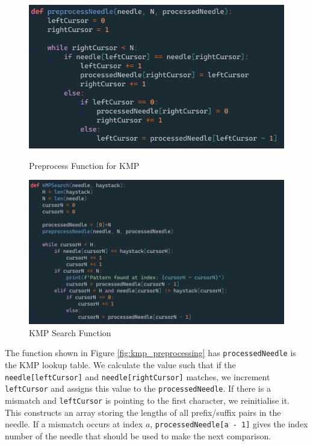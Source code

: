 \begin{figure}[H]
  \centering
  \begin{minipage}[b]{0.49\textwidth}
    \includegraphics[width=\textwidth]{images/preprocessKMP.png}
    \caption{Preprocess Function for KMP}
    \label{fig:kmp_preprocessing}
  \end{minipage}
  \hfill
  \begin{minipage}[b]{0.49\textwidth}
    \includegraphics[width=\textwidth]{images/KMP.png}
    \caption{KMP Search Function}
    \label{fig:kmp_search}
  \end{minipage}
\end{figure}

The function shown in Figure \ref{fig:kmp_preprocessing} has \texttt{processedNeedle} is the KMP lookup table. We calculate the value such that if the \texttt{needle[leftCursor]} and \texttt{needle[rightCursor]} matches, we increment \texttt{leftCursor} and assigns this value to the \texttt{processedNeedle}. If there is a mismatch and \texttt{leftCursor} is pointing to the first character, we reinitialise it. This constructs an array storing the lengths of all prefix/suffix pairs in the needle. If a mismatch occurs at index $a$, \texttt{processedNeedle[a - 1]} gives the index number of the needle that should be used to make the next comparison. 

